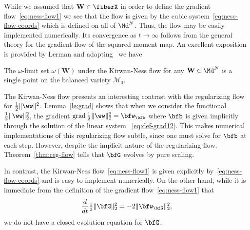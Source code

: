 %
\begin{remark}
While we assumed that $\mathbf{W}\in \fiberX$ in order to define the gradient flow~\eqref{eq:ness-flow1} we see that the flow is given by the cubic system~\eqref{eq:ness-flow-coords} which is defined on all of $\Md^N$. Thus, the flow may be easily implemented numerically. Its convergence as $t \to \infty$ follows from the general theory for the gradient flow of the squared moment map. An excellent exposition is provided by Lerman and adapting~\cite[Thm. 1]{Lerman} we have
\begin{corollary}
\label{cor:ness-flow}
The $\omega$-limit set $\omega(\mathbf{W})$ under the Kirwan-Ness flow for any $\mathbf{W}\in \Md^N$  is a single point on the balanced variety $\mathcal{M}_0$. 
\end{corollary}
\end{remark}
The Kirwan-Ness flow presents an interesting contrast with the regularizing flow for $\tfrac{1}{2}\|\ww\|^2$. Lemma~\ref{le:grad} shows that when we consider the functional $\tfrac{1}{2}\|\ww\|_2^2$, the gradient $\grad \tfrac{1}{2} \|\ww\|_2^2 =\bfw_\bfb$ where $\bfb$ is given implicitly through the solution of the linear system ~\eqref{eq:def-grad12}. This makes numerical implementations of this regularizing flow subtle, since one must solve for $\bfb$ at each step. However, despite the implicit nature of the regularizing flow, Theorem~\ref{thm:reg-flow} tells that $\bfG$ evolves by pure scaling.

In contrast, the Kirwan-Ness flow~\eqref{eq:ness-flow1} is given explicitly by~\eqref{eq:ness-flow-coords} and is easy to implement numerically. On the other hand, while it is immediate from the definition of the gradient flow~\eqref{eq:ness-flow1} that 
\begin{equation}
\label{eq:ness-flow7}
    \frac{d}{dt}\tfrac{1}{2}{\|\bfG\|_2^2} =  - 2\|\bfw_\bfG \|_2^2 ,
\end{equation}
we do not have a closed evolution equation for $\bfG$.





 



